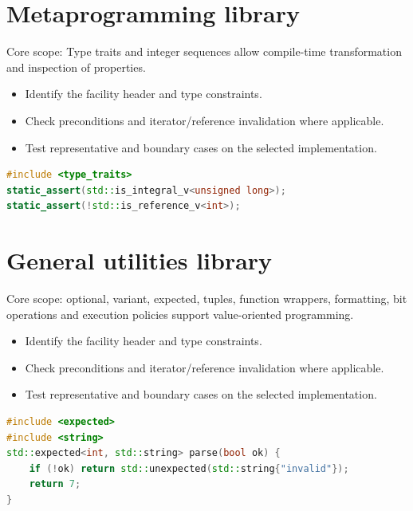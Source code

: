 \documentclass[11pt]{article}
\begin{document}
\section{Metaprogramming library}
Core scope: Type traits and integer sequences allow compile-time transformation and inspection of properties.

\begin{itemize}[leftmargin=*,itemsep=1pt,topsep=3pt]
\item Identify the facility header and type constraints.
\item Check preconditions and iterator/reference invalidation where applicable.
\item Test representative and boundary cases on the selected implementation.
\end{itemize}
\begin{lstlisting}[language=C++]
#include <type_traits>
static_assert(std::is_integral_v<unsigned long>);
static_assert(!std::is_reference_v<int>);
\end{lstlisting}
\section{General utilities library}
Core scope: optional, variant, expected, tuples, function wrappers, formatting, bit operations and execution policies support value-oriented programming.

\begin{itemize}[leftmargin=*,itemsep=1pt,topsep=3pt]
\item Identify the facility header and type constraints.
\item Check preconditions and iterator/reference invalidation where applicable.
\item Test representative and boundary cases on the selected implementation.
\end{itemize}
\begin{lstlisting}[language=C++]
#include <expected>
#include <string>
std::expected<int, std::string> parse(bool ok) {
    if (!ok) return std::unexpected(std::string{"invalid"});
    return 7;
}
\end{lstlisting}
\end{document}
